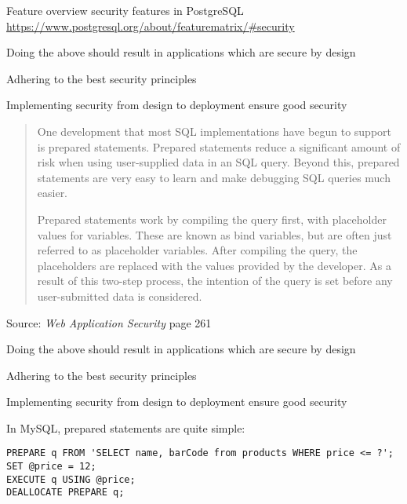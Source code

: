 \documentclass[Screen16to9,17pt]{foils}
\begin{document}

Feature overview security features in PostgreSQL\\
\url{https://www.postgresql.org/about/featurematrix/#security}




\begin{list2}
\item Doing the above should result in applications which are secure by design
\item Adhering to the best security principles
\item Implementing security from design to deployment ensure good security
\end{list2}





\begin{quote}
One development that most SQL implementations have begun to support is prepared statements. Prepared statements reduce a significant amount of risk when using user-supplied data in an SQL query. Beyond this, prepared statements are very easy to learn and make debugging SQL queries much easier.

Prepared statements work by compiling the query first, with placeholder values for variables. These are known as bind variables, but are often just referred to as placeholder variables. After compiling the query, the placeholders are replaced with the values provided by the developer. As a result of this two-step process, the intention of the query is set before any user-submitted data is considered.
\end{quote}
Source: \emph{Web Application Security} page 261

\begin{list2}
\item Doing the above should result in applications which are secure by design
\item Adhering to the best security principles
\item Implementing security from design to deployment ensure good security
\end{list2}


In MySQL, prepared statements are quite simple:
\begin{verbatim}
PREPARE q FROM 'SELECT name, barCode from products WHERE price <= ?';
SET @price = 12;
EXECUTE q USING @price;
DEALLOCATE PREPARE q;
\end{verbatim}
\end{document}
